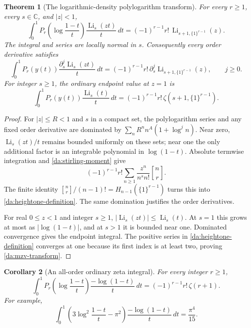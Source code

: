 \documentclass[11pt,letterpaper]{article}
\numberwithin{equation}{section}
\newtheorem{theorem}{Theorem}[section]
\newtheorem{corollary}[theorem]{Corollary}
\theoremstyle{definition}
\theoremstyle{remark}
\DeclareMathOperator{\Li}{Li}
\newcommand{\dd}{\,d}
\newcommand{\stir}[2]{\genfrac{[}{]}{0pt}{}{#1}{#2}}
\newcommand{\one}[1]{\{1\}^{#1}}
\begin{document}
\begin{theorem}[The logarithmic-density polylogarithm transform]
\label{da:polylog}
For every \(r\ge1\), every \(s\in\mathbb C\), and \(|z|<1\),
\begin{equation}\label{da:polylog-transform}
 \boxed{\displaystyle
 \int_0^1 P_r\!\left(\log\frac{1-t}{t}\right)
                \frac{\Li_s(zt)}t\dd t
   =(-1)^{r-1}r!\,\Li_{s+1,\one{r-1}}(z).}
\end{equation}
The integral and series are locally normal in \(s\). Consequently every
order derivative satisfies
\begin{equation}\label{da:polylog-order-jets}
 \int_0^1P_r(y(t))\frac{\partial_s^j\Li_s(zt)}t\dd t
  =(-1)^{r-1}r!\,
       \partial_s^j\Li_{s+1,\one{r-1}}(z),\qquad j\ge0.
\end{equation}
For integer \(s\ge1\), the ordinary endpoint value at \(z=1\) is
\begin{equation}\label{da:mzv-transform}
 \int_0^1P_r(y(t))\frac{\Li_s(t)}t\dd t
   =(-1)^{r-1}r!\,\zeta(s+1,\one{r-1}).
\end{equation}
\end{theorem}

\begin{proof}
For \(|z|\le R<1\) and \(s\) in a compact set, the polylogarithm
series and any fixed order derivative are dominated by
\(\sum_n R^n n^A(1+\log^j n)\). Near zero,
\(\Li_s(zt)/t\) remains bounded uniformly on these sets; near one
the only additional factor is an integrable polynomial in
\(\log(1-t)\). Absolute termwise integration and
\eqref{da:stirling-moment} give
\[
 (-1)^{r-1}r!\sum_{n\ge1}
       \frac{z^n}{n^s n!}\stir nr.
\]
The finite identity
\(\stir nr/(n-1)!=H_{n-1}(\one{r-1})\) turns this into
\eqref{da:heightone-definition}. The same domination justifies the
order derivatives.

For real \(0\le z<1\) and integer \(s\ge1\),
\(|\Li_s(zt)|\le\Li_s(t)\). At \(s=1\) this grows at most as
\(|\log(1-t)|\), and at \(s>1\) it is bounded near one.
Dominated convergence gives the endpoint integral. The positive series
in \eqref{da:heightone-definition} converges at one because its first
index is at least two, proving \eqref{da:mzv-transform}.
\end{proof}

\begin{corollary}[An all-order ordinary zeta integral]
\label{da:zeta-integral}
For every integer \(r\ge1\),
\begin{equation}\label{da:zeta-integral-formula}
 \int_0^1P_r\!\left(\log\frac{1-t}{t}\right)
       \frac{-\log(1-t)}t\dd t
     =(-1)^{r-1}r!\,\zeta(r+1).
\end{equation}
For example,
\begin{equation}\label{da:pi-four}
 \boxed{\displaystyle
 \int_0^1\left(3\log^2\frac{1-t}{t}-\pi^2\right)
             \frac{-\log(1-t)}t\dd t=\frac{\pi^4}{15}.}
\end{equation}
\end{corollary}
\end{document}
